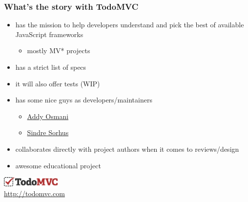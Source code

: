 \documentclass[compress]{beamer}
\begin{document}
\begin{frame}

\frametitle{What's the story with TodoMVC}

\begin{itemize}[<+->]
  \item has the mission to help developers understand and pick the best of available JavaScript frameworks
    \begin{itemize}[<+->]
      \item mostly MV* projects
    \end{itemize}
  \item has a strict list of specs
  \item it will also offer tests (WIP)
  \item has some nice guys as developers/maintainers
    \begin{itemize}[<+->]
      \item \href{https://twitter.com/addyosmani}{Addy Osmani}
      \item \href{https://twitter.com/sindresorhus}{Sindre Sorhus}
    \end{itemize}
  \item collaborates directly with project authors when it comes to reviews/design
  \item awesome educational project
\end{itemize}

\begin{flushright}
  \colorbox{white}{\includegraphics[height=0.5cm]{todomvc.png}}
  \\
  \tiny \url{http://todomvc.com}
\end{flushright}

\end{frame}
\end{document}
